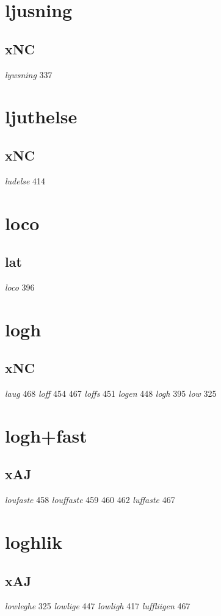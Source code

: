 \documentclass[a4paper,twocolumn]{article}
\begin{document}
\section{ljusning}
\label{sec:org30205d4}
\subsection{xNC}
\label{sec:org1900f30}
\emph{lywsning} 337 
\section{ljuthelse}
\label{sec:orgd7870cd}
\subsection{xNC}
\label{sec:org01fe061}
\emph{ludelse} 414 
\section{loco}
\label{sec:orgb96342c}
\subsection{lat}
\label{sec:org2db5a71}
\emph{loco} 396 
\section{logh}
\label{sec:org0799535}
\subsection{xNC}
\label{sec:org6686bd0}
\emph{laug} 468 \emph{loff} 454 467 \emph{loffs} 451 \emph{logen} 448 \emph{logh} 395 \emph{low} 325 
\section{logh+fast}
\label{sec:org623a849}
\subsection{xAJ}
\label{sec:org098fb14}
\emph{loufaste} 458 \emph{louffaste} 459 460 462 \emph{luffaste} 467 
\section{loghlik}
\label{sec:org771aa1a}
\subsection{xAJ}
\label{sec:org5a7ad15}
\emph{lowleghe} 325 \emph{lowlige} 447 \emph{lowligh} 417 \emph{luffliigen} 467 
\end{document}
